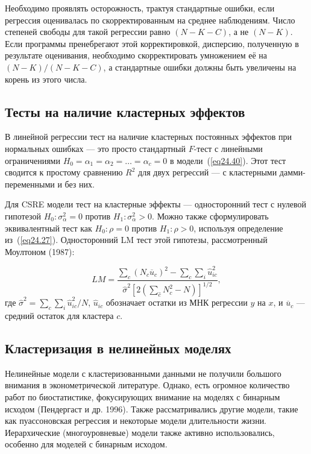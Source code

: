 Необходимо проявлять осторожность, трактуя стандартные ошибки, если регрессия оценивалась по скорректированным на среднее наблюдениям. Число степеней свободы для такой регрессии равно $(N-K-C)$, а не $(N-K)$. Если программы пренебрегают этой корректировкой, дисперсию, полученную в результате оценивания, необходимо скорректировать умножением её на $(N-K)/(N-K-C)$, а стандартные ошибки должны быть увеличены на корень из этого числа. 

\subsection{Тесты на наличие кластерных эффектов}

В линейной регрессии тест на наличие кластерных постоянных эффектов при нормальных ошибках --- это просто стандартный $F$-тест с линейными ограничениями $H_0 = \alpha_1 = \alpha_2 = \dots =\alpha_c = 0$ в модели~(\ref{eq24.40}). Этот тест сводится к простому сравнению $R^2$ для двух регрессий --- с кластерными дамми-переменными и без них. 

Для CSRE модели тест на кластерные эффекты --- односторонний тест с нулевой гипотезой $H_0: \sigma^2_{\alpha} = 0$ против $H_1 : \sigma^2_{\alpha} > 0$. Можно также сформулировать эквивалентный тест как $H_0: \rho = 0$ против $H_1 : \rho > 0$, используя определение из~(\ref{eq24.27}). Односторонний LM тест этой гипотезы, рассмотренный Моултоном (1987):

\begin{equation}
\label{eq24.43}
LM = \frac{\sum_c (N_c \overline{u}_c)^2 - \sum_c \sum_i \hat u_{ic}^2}{\hat \sigma^2 [2(\sum_{\hat c} N_c^2 - N)]^{1/2}},
\end{equation}
где $\hat \sigma^2 = \sum_c \sum_i \hat u^2_{ic} / N$, $\hat u_{ic}$ обозначает остатки из МНК регрессии $y$ на $x$, и $\overline{u}_c$ --- средний остаток для кластера $c$. 

\subsection{Кластеризация в нелинейных моделях}

Нелинейные модели с кластеризованными данными не получили большого внимания в эконометрической литературе. Однако, есть огромное количество работ по биостатистике, фокусирующих внимание на моделях с бинарным исходом (Пендергаст и др. 1996). Также рассматривались другие модели, такие как пуассоновская регрессия и некоторые модели длительности жизни. Иерархические (многоуровневые) модели также активно использовались, особенно для моделей с бинарным исходом. 

